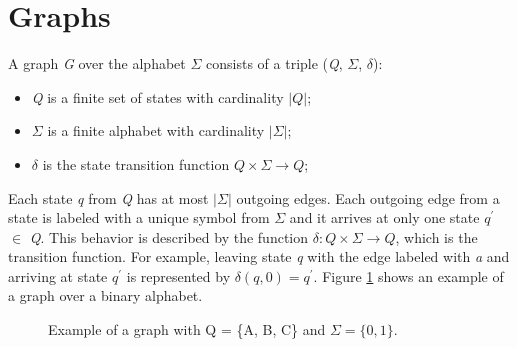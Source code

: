 {\section{Graphs}

\begin{definition}\label{def:graph}
A graph \textit{G} over the alphabet $\Sigma$ consists of a triple (\textit{Q}, $\Sigma$, $\delta$):
\begin{itemize}
	\item \textit{Q} is a finite set of states with cardinality $|Q|$;
    \item $\Sigma$ is a finite alphabet with cardinality $|\Sigma|$;
    \item $\delta$ is the state transition function $Q\times\Sigma \rightarrow Q$;
\end{itemize}
\end{definition}

Each state \textit{q} from \textit{Q} has at most $|\Sigma|$ outgoing edges. Each outgoing edge from a state is labeled with a unique symbol from $\Sigma$ and it arrives at only one state \textit{$q^{\prime}$} $\in$ \textit{Q}. This behavior is described by the function $\delta : Q \times \Sigma \rightarrow Q$, which is the transition function. For example, leaving state \textit{q} with the edge labeled with \textit{a} and arriving at state \textit{$q^{\prime}$} is represented by $\delta(q, 0) = q^{\prime}$. Figure \ref{fig:graph} shows an example of a graph over a binary alphabet.

\begin{figure}
\centering
{}
\caption{Example of a graph with Q = \{A, B, C\} and $\Sigma = \{0, 1\}$.\label{fig:graph}}
\end{figure}

}
